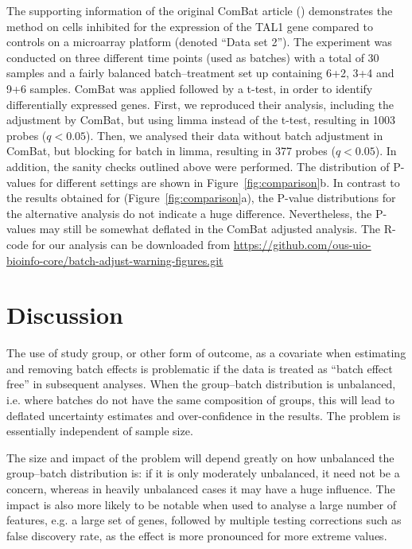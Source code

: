 \documentclass{bio}
\begin{document}
The supporting information of the original ComBat article (\citealp{Johnson2007}) demonstrates the method on cells inhibited for the expression of the TAL1 gene compared to controls on a microarray platform (denoted ``Data set 2''). The experiment was conducted on three different time points (used as batches) with a total of 30 samples and a fairly balanced batch--treatment set up containing 6+2, 3+4 and 9+6 samples. ComBat was applied followed by a t-test, in order to identify differentially expressed genes. First, we reproduced their analysis, including the adjustment by ComBat, but using limma instead of the t-test, resulting in 1003 probes ($q<0.05$).  Then, we analysed their data without batch adjustment in ComBat, but blocking for batch in limma, resulting in 377 probes ($q<0.05$). In addition, the sanity checks outlined above were performed. The distribution of P-values for different settings are shown in Figure~\ref{fig:comparison}b. In contrast to the results obtained for \citet{Towfic2014} (Figure~\ref{fig:comparison}a), the P-value distributions for the alternative analysis do not indicate a huge difference. Nevertheless, the P-values may still be somewhat deflated in the ComBat adjusted analysis. The R-code for our analysis can be downloaded from \href{https://github.com/ous-uio-bioinfo-core/batch-adjust-warning-figures.git}{https://github.com/ous-uio-bioinfo-core/batch-adjust-warning-figures.git}


\section{Discussion}

The use of study group, or other form of outcome, as a covariate when estimating and removing batch effects is problematic if the data is treated as ``batch effect free'' in subsequent analyses. When the group--batch distribution is unbalanced, i.e. where batches do not have the same composition of groups, this will lead to deflated uncertainty estimates and over-confidence in the results. The problem is essentially independent of sample size.

The size and impact of the problem will depend greatly on how unbalanced the group--batch distribution is: if it is only moderately unbalanced, it need not be a concern, whereas in heavily unbalanced cases it may have a huge influence. The impact is also more likely to be notable when used to analyse a large number of features, e.g. a large set of genes, followed by multiple testing corrections such as false discovery rate, as the effect is more pronounced for more extreme values.
\end{document}
